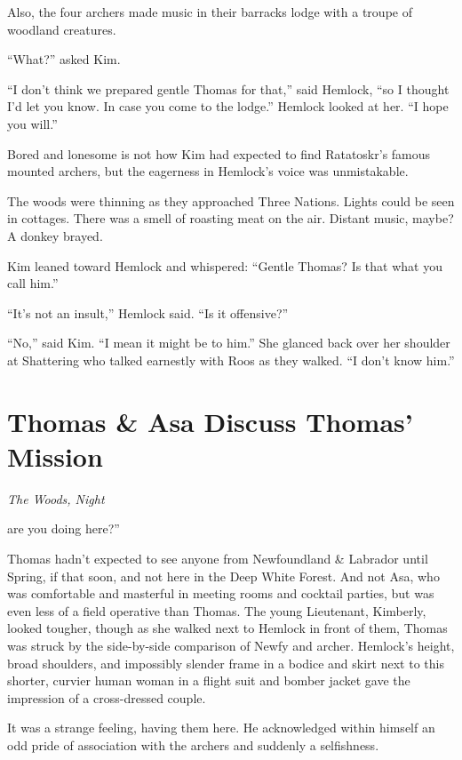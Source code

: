 \documentclass[11pt,a5paper]{article}
\newcommand{\alet}[1]{\textit{#1}\vspace{1em}}
\begin{document}
Also, the four archers made music in their barracks lodge with a troupe of woodland creatures.

``What?'' asked Kim.

``I don't think we prepared gentle Thomas for that,'' said Hemlock, ``so I thought I'd let you know. In case you come to the lodge.'' Hemlock looked at her. ``I hope you will.''

Bored and lonesome is not how Kim had expected to find Ratatoskr's famous mounted archers, but the eagerness in Hemlock's voice was unmistakable.

The woods were thinning as they approached Three Nations. Lights could be seen in cottages. There was a smell of roasting meat on the air. Distant music, maybe? A donkey brayed.

Kim leaned toward Hemlock and whispered: ``Gentle Thomas? Is that what you call him.''

``It's not an insult,'' Hemlock said. ``Is it offensive?''

``No,'' said Kim. ``I mean it might be to him.'' She glanced back over her shoulder at Shattering who talked earnestly with Roos as they walked. ``I don't know him.''

\newpage

\section{Thomas \& Asa Discuss Thomas' Mission}

\alet{The Woods, Night}

 are you doing here?''

Thomas hadn't expected to see anyone from Newfoundland \& Labrador until Spring, if that soon, and not here in the Deep White Forest. And not Asa, who was comfortable and masterful in meeting rooms and cocktail parties, but was even less of a field operative than Thomas. The young Lieutenant, Kimberly, looked tougher, though as she walked next to Hemlock in front of them, Thomas was struck by the side-by-side comparison of Newfy and archer. Hemlock's height, broad shoulders, and impossibly slender frame in a bodice and skirt next to this shorter, curvier human woman in a flight suit and bomber jacket gave the impression of a cross-dressed couple.

It was a strange feeling, having them here. He acknowledged within himself an odd pride of association with the archers and suddenly a selfishness.
\end{document}
